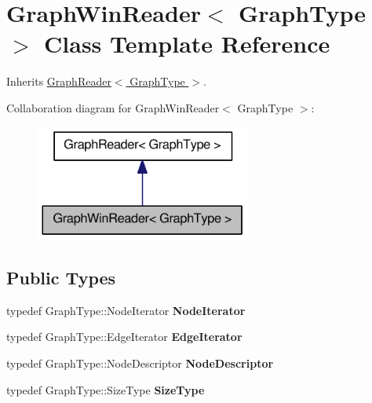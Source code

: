 \hypertarget{class_graph_win_reader}{
\section{GraphWinReader$<$ GraphType $>$ Class Template Reference}
\label{class_graph_win_reader}
}


Inherits \hyperlink{class_graph_reader}{GraphReader$<$ GraphType $>$}.



Collaboration diagram for GraphWinReader$<$ GraphType $>$:\nopagebreak
\begin{figure}[H]
\begin{center}
\leavevmode
\includegraphics[width=200pt]{class_graph_win_reader__coll__graph}
\end{center}
\end{figure}
\subsection*{Public Types}
\begin{DoxyCompactItemize}
\item 
\hypertarget{class_graph_win_reader_aca4bd9fa144df4461c32572ee86eda58}{
typedef GraphType::NodeIterator {\bfseries NodeIterator}}
\label{class_graph_win_reader_aca4bd9fa144df4461c32572ee86eda58}

\item 
\hypertarget{class_graph_win_reader_a2d1f2766079d6a27cd89c97492f8f086}{
typedef GraphType::EdgeIterator {\bfseries EdgeIterator}}
\label{class_graph_win_reader_a2d1f2766079d6a27cd89c97492f8f086}

\item 
\hypertarget{class_graph_win_reader_aa84d1db36b3153e3971c89e28b49e3f3}{
typedef GraphType::NodeDescriptor {\bfseries NodeDescriptor}}
\label{class_graph_win_reader_aa84d1db36b3153e3971c89e28b49e3f3}

\item 
\hypertarget{class_graph_win_reader_aaaf936af7d8ff3be46dcf461cc3d20b0}{
typedef GraphType::SizeType {\bfseries SizeType}}
\label{class_graph_win_reader_aaaf936af7d8ff3be46dcf461cc3d20b0}

\end{DoxyCompactItemize}
